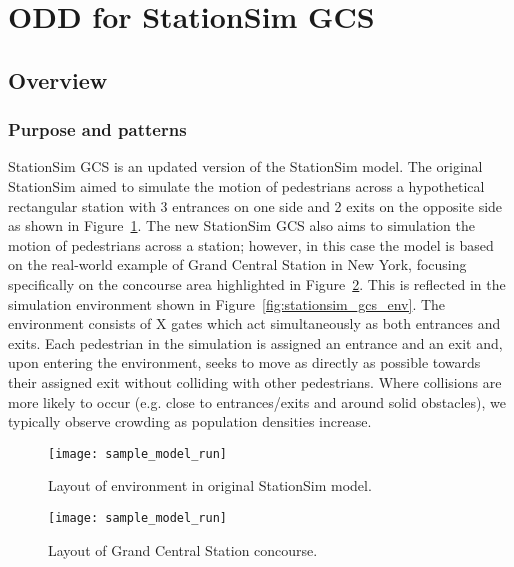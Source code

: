 \section{ODD for StationSim GCS}\label{sec:stationsim}

\subsection{Overview}\label{sub:stationsim:overview}

\subsubsection{Purpose and patterns}\label{subs:stationsim:overview:purpose}

StationSim GCS is an updated version of the StationSim model.
The original StationSim aimed to simulate the motion of pedestrians across a
hypothetical rectangular station with 3 entrances on one side and 2 exits on the
opposite side as shown in Figure~\ref{fig:stationsim_env}.
The new StationSim GCS also aims to simulation the motion of pedestrians across
a station; however, in this case the model is based on the real-world example of
Grand Central Station in New York, focusing specifically on the concourse area
highlighted in Figure~\ref{fig:gcs_concourse}.
This is reflected in the simulation environment shown in
Figure~\ref{fig:stationsim_gcs_env}.
The environment consists of X gates which act simultaneously as both entrances
and exits.
Each pedestrian in the simulation is assigned an entrance and an exit and, upon
entering the environment, seeks to move as directly as possible towards their
assigned exit without colliding with other pedestrians.
Where collisions are more likely to occur (e.g. close to entrances/exits and
around solid obstacles), we typically observe crowding as population densities
increase.


\begin{figure}[h]
    \centering
    \texttt{[image: sample\_model\_run]}
    \caption{Layout of environment in original StationSim model.}

    \label{fig:stationsim_env}
\end{figure}

\begin{figure}[h]
    \centering
    \texttt{[image: sample\_model\_run]}
    \caption{Layout of Grand Central Station concourse.}
    \label{fig:gcs_concourse}
\end{figure}

